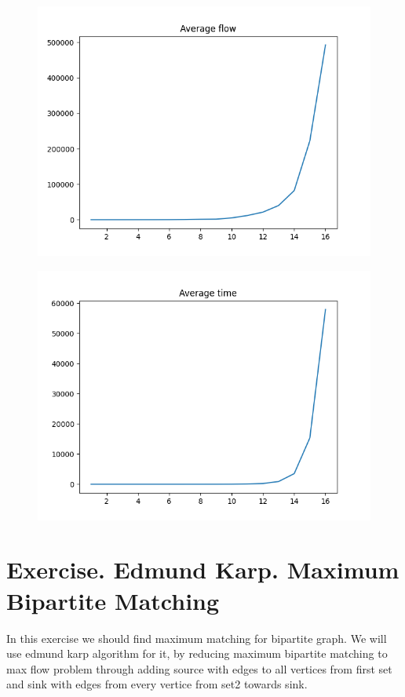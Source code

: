 \documentclass[11pt]{article}
\begin{document}
\begin{figure}[h!]
    \includegraphics*{plots/flow.png}
\end{figure}
\begin{figure}[h!]
    \includegraphics*{plots/time.png}
\end{figure} 

\section{Exercise. Edmund Karp. Maximum Bipartite Matching}
In this exercise we should find maximum matching for bipartite graph.
We will use edmund karp algorithm for it, by reducing maximum bipartite matching to max flow problem through adding source with edges to all vertices from first set and sink with edges from every vertice from set2 towards sink. \\
  
\end{document}

